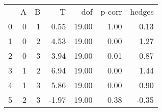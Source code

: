 \begin{tabular}{lrrrrrr}
 & A & B & T & dof & p-corr & hedges \\
0 & 0 & 1 & 0.55 & 19.00 & 1.00 & 0.13 \\
1 & 0 & 2 & 4.53 & 19.00 & 0.00 & 1.27 \\
2 & 0 & 3 & 3.94 & 19.00 & 0.01 & 0.87 \\
3 & 1 & 2 & 6.94 & 19.00 & 0.00 & 1.44 \\
4 & 1 & 3 & 5.86 & 19.00 & 0.00 & 0.90 \\
5 & 2 & 3 & -1.97 & 19.00 & 0.38 & -0.35 \\
\end{tabular}
